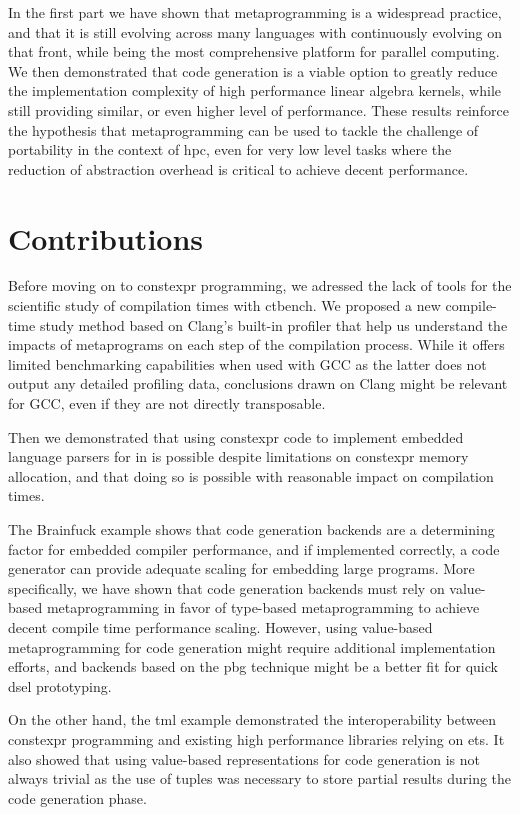 \documentclass[main]{subfiles}
\begin{document}
In the first part we have shown that metaprogramming is a widespread practice,
and that it is still evolving across many languages with \cpp continuously
evolving on that front, while being the most comprehensive platform for
parallel computing.
We then demonstrated that code generation is a viable option to greatly reduce
the implementation complexity of high performance linear algebra kernels,
while still providing similar, or even higher level of performance.
These results reinforce the hypothesis that metaprogramming can be used to
tackle the challenge of portability in the context of \acrlong{hpc},
even for very low level tasks where the reduction of abstraction overhead
is critical to achieve decent performance.

\section*{Contributions}

Before moving on to \gls{constexpr} programming, we adressed the lack of
tools for the scientific study of compilation times with ctbench.
We proposed a new compile-time study method based on Clang's built-in
profiler that help us understand the impacts of metaprograms on each step
of the compilation process. While it offers limited benchmarking capabilities
when used with GCC as the latter does not output any detailed profiling data,
conclusions drawn on Clang might be relevant for GCC, even if they are not
directly transposable.

Then we demonstrated that using \gls{constexpr} code to
implement embedded language parsers for in  is possible despite
limitations on \gls{constexpr} memory allocation, and that doing so is possible
with reasonable impact on compilation times.

The Brainfuck example shows that code generation backends are
a determining factor for embedded compiler performance,
and if implemented correctly, a code generator can provide
adequate scaling for embedding large programs.
More specifically, we have shown that code generation backends must rely on
value-based metaprogramming in favor of type-based metaprogramming to achieve
decent compile time performance scaling. However, using value-based
metaprogramming for code generation might require additional implementation
efforts, and backends based on the \gls{pbg} technique might be a better fit
for quick \gls{dsel} prototyping.

\clearpage%

On the other hand, the \gls{tml} example demonstrated the interoperability
between \gls{constexpr} programming and existing high performance libraries
relying on \glspl{et}. It also showed that using value-based representations for
code generation is not always trivial as the use of tuples was necessary to
store partial results during the code generation phase.
\end{document}

